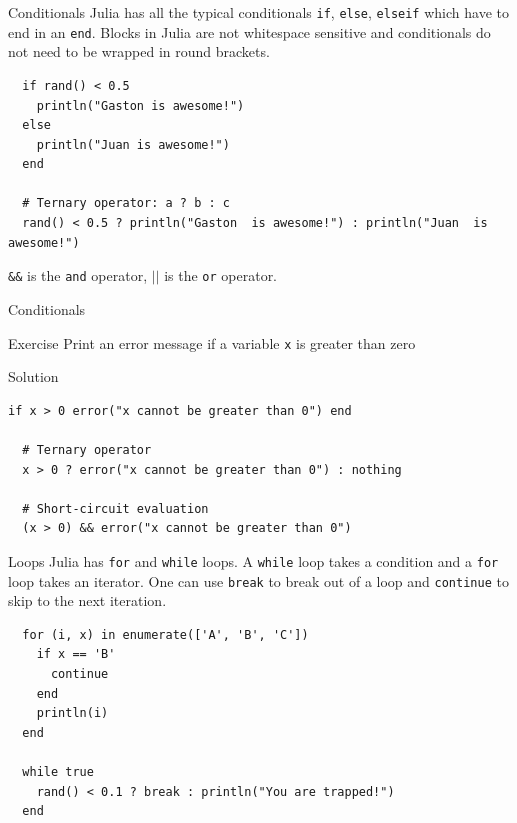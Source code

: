 \documentclass{beamer}
\begin{document}
\begin{frame}[fragile]{Conditionals}
  Julia has all the typical conditionals \verb|if|, \verb|else|, \verb|elseif| which have to end in an \verb|end|.
  Blocks in Julia are not whitespace sensitive and conditionals do not need to be wrapped in round brackets.
  \begin{lstlisting}
  if rand() < 0.5
    println("Gaston is awesome!")
  else
    println("Juan is awesome!")
  end
  
  # Ternary operator: a ? b : c
  rand() < 0.5 ? println("Gaston  is awesome!") : println("Juan  is awesome!")
\end{lstlisting}

\verb|&&| is the \verb|and| operator, $||$ is the \verb|or| operator.
\end{frame}


\begin{frame}[fragile]{Conditionals}
	\begin{block}{Exercise}
	Print an error message if a variable \verb|x| is greater than zero
	\end{block}
	\vfill
	\begin{block}{Solution}
		\begin{lstlisting}[mathescape]
  if x > 0 error("x cannot be greater than 0") end
	
  # Ternary operator		
  x > 0 ? error("x cannot be greater than 0") : nothing
			
  # Short-circuit evaluation
  (x > 0) && error("x cannot be greater than 0")
		\end{lstlisting}
	\end{block}
\end{frame}

\begin{frame}[fragile]{Loops}
  Julia has \verb|for| and \verb|while| loops. A \verb|while| loop takes a condition and a \verb|for| loop takes an iterator.
  One can use \verb|break| to break out of a loop and \verb|continue| to skip to the next iteration. %
  \begin{lstlisting}
  for (i, x) in enumerate(['A', 'B', 'C'])
    if x == 'B'
      continue
    end
    println(i)
  end

  while true
    rand() < 0.1 ? break : println("You are trapped!")
  end
  \end{lstlisting}
\end{frame}
\end{document}
